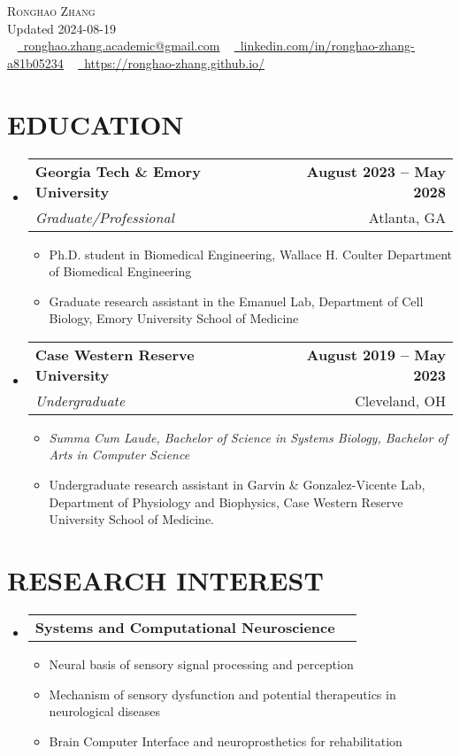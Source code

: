 \documentclass[letterpaper,11pt]{article}
\makeatletter
\newcommand{\resumeItem}[1]{
	\item\small{
		{#1 \vspace{0pt}}
	}
}
\newcommand{\resumeSubheading}[4]{
	\vspace{-2pt}\item
	\begin{tabular*}{1.0\textwidth}[t]{l@{\extracolsep{\fill}}r}
		\textbf{#1} & \textbf{\small #2} \\
		\textit{\small#3} & {\small #4} \\
	\end{tabular*}\vspace{-4pt}
}
\newcommand{\resumeResearchHeading}[2]{
	\vspace{-2pt}\item
	\begin{tabular*}{1.0\textwidth}[t]{l@{\extracolsep{\fill}}r}
		\textbf{#1} & \textbf{\small #2} \\
	\end{tabular*}\vspace{-4pt}
}
\newcommand{\resumeSubHeadingListStart}{\begin{itemize}[leftmargin=0.0in, label={}]}
\newcommand{\resumeSubHeadingListEnd}{\end{itemize}}
\newcommand{\resumeItemListStart}{\begin{itemize}}
\newcommand{\resumeItemListEnd}{\end{itemize}\vspace{-5pt}}
\makeatother
\begin{document}
	
	\begin{center}
		{\Huge \scshape Ronghao Zhang} 
		\\ \vspace{5pt}
		Updated 2024-08-19
		\\ \vspace{5pt}
		\small \raisebox{-0.1\height} ~ 
		\href{mailto:x@gmail.com}{\raisebox{-0.2\height}\faEnvelope\          \underline{ronghao.zhang.academic@gmail.com}} ~ 
		\href{https://linkedin.com/in//}{\raisebox{-0.2\height}\faLinkedin\     \underline{linkedin.com/in/ronghao-zhang-a81b05234}}  ~
		\href{https://ronghao-zhang.github.io/}{\raisebox{-0.2\height}\faGithub\ \underline{https://ronghao-zhang.github.io/}}
		\vspace{1pt}
	\end{center}
	
	\section{EDUCATION}
	\resumeSubHeadingListStart
	\resumeSubheading
	{Georgia Tech \& Emory University}{August 2023 -- May 2028}
	{Graduate/Professional}{Atlanta, GA}
	\resumeItemListStart
	\resumeItem{Ph.D. student in Biomedical Engineering, Wallace H. Coulter Department of Biomedical Engineering}
	\resumeItem{Graduate research assistant in the Emanuel Lab, Department of Cell Biology, Emory University School of Medicine}
	\resumeItemListEnd
	\resumeSubheading
	{Case Western Reserve University}{August 2019 -- May 2023}
	{Undergraduate}{Cleveland, OH}
	\resumeItemListStart
	\resumeItem{\it{Summa Cum Laude}, Bachelor of Science in Systems Biology, Bachelor of Arts in Computer Science}
	\resumeItem{Undergraduate research assistant in Garvin \& Gonzalez-Vicente Lab, Department of Physiology and Biophysics, Case Western Reserve University School of Medicine.}
	\resumeItemListEnd
	\resumeSubHeadingListEnd
	
	\section{RESEARCH INTEREST}
	\resumeSubHeadingListStart
	\resumeResearchHeading{Systems and Computational Neuroscience}{}
	\resumeItemListStart
	\resumeItem{Neural basis of sensory signal processing and perception}
	\resumeItem{Mechanism of sensory dysfunction and potential therapeutics in neurological diseases}
	\resumeItem{Brain Computer Interface and neuroprosthetics for rehabilitation}
	\resumeItemListEnd
	\resumeSubHeadingListEnd      
	
\end{document}
